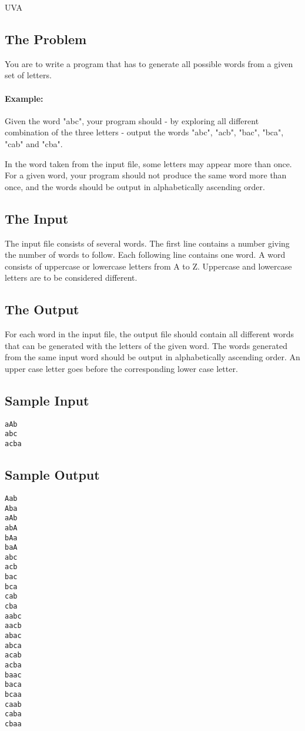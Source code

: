 

\noindent
UVA \bigskip

\subsection*{The Problem}

You are to write a program that has to generate all possible words from
a given set of letters.

\paragraph{Example:}
Given the word "abc", your program should - by exploring all different
combination of the three letters - output the words "abc", "acb",
"bac", "bca", "cab" and "cba".

In the word taken from the input file, some letters may appear more than
once. For a given word, your program should not produce the same word more
than once, and the words should be output in alphabetically ascending order.



\subsection*{The Input}

The input file consists of several words. The first line contains a number
giving the number of words to follow. Each following line contains one word.
A word consists of uppercase or lowercase letters from A to Z. Uppercase
and lowercase letters are to be considered different.

\subsection*{The Output}

For each word in the input file, the output file should contain all different
words that can be generated with the letters of the given word. The words
generated from the same input word should be output in alphabetically ascending
order. An upper case letter goes before the corresponding lower case letter.


\subsection*{Sample Input}
\begin{verbatim}
aAb
abc
acba
\end{verbatim}

\subsection*{Sample Output}
\begin{verbatim}
Aab
Aba
aAb
abA
bAa
baA
abc
acb
bac
bca
cab
cba
aabc
aacb
abac
abca
acab
acba
baac
baca
bcaa
caab
caba
cbaa
\end{verbatim}